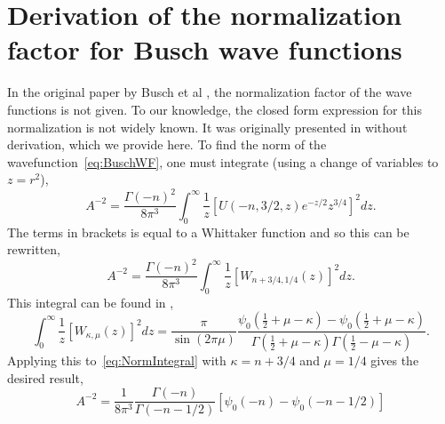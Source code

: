 \documentclass[%
 notitlepage,
 preprint,
showpacs,%
 amsmath,amssymb,
 aps,
pra,
]{revtex4-1}
\begin{document}
\section{Derivation of the normalization factor for Busch wave functions}
In the original paper by Busch et al \cite{Busch}, the normalization factor of the wave functions is not given. To our knowledge, the closed form expression for this normalization is not widely known. It was originally presented in \cite{PhysRevA.85.053614} without derivation, which we provide here. To find the norm of the wavefunction~\eqref{eq:BuschWF}, one must integrate (using a change of variables to $z=r^2$),
\begin{equation}\label{eq:NormIntegral}
A^{-2}=\frac{\Gamma(-n)^2}{8\pi^3}  \int_0^\infty \frac{1}{z}\left[U(-n,3/2,z)e^{-z/2} z^{3/4} \right]^2  dz.
\end{equation}
The terms in brackets is equal to a Whittaker function \cite{DLMF} and so this can be rewritten,
\begin{equation}
A^{-2}=\frac{\Gamma(-n)^2}{8\pi^3}  \int_0^\infty \frac{1}{z}\left[W_{n+3/4,1/4}(z) \right]^2  dz.
\end{equation}
This integral can be found in \cite{GradshteynRyzhik},
\begin{equation}
\int_0^\infty \frac{1}{z}\left[W_{\kappa,\mu}(z) \right]^2  dz=\frac{\pi}{\sin (2\pi \mu)}\frac{\psi_0(\frac{1}{2}+\mu-\kappa)-\psi_0(\frac{1}{2}+\mu-\kappa)}{\Gamma(\frac{1}{2}+\mu-\kappa)\Gamma(\frac{1}{2}-\mu-\kappa)}.
\end{equation}
Applying this to~\eqref{eq:NormIntegral} with $\kappa=n+3/4$ and $\mu=1/4$ gives the desired result,
\begin{equation}
A^{-2}=\frac{1}{8\pi^3}  \frac{\Gamma (-n)}{\Gamma(-n-1/2)}\left[\psi_0(-n)-\psi_0(-n-1/2)\right]
\end{equation}
\end{document}
